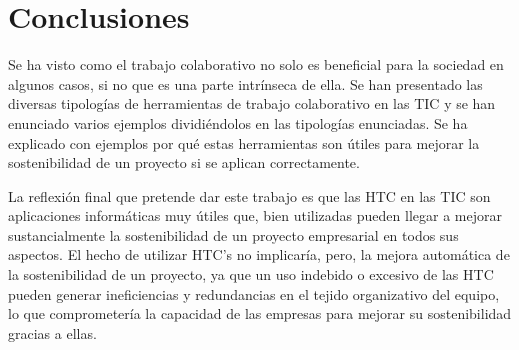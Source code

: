\section{Conclusiones}

Se ha visto como el trabajo colaborativo no solo es beneficial para la sociedad en algunos casos, si no que es una parte intrínseca de ella. Se han presentado las diversas tipologías de herramientas de trabajo colaborativo en las TIC y se han enunciado varios ejemplos dividiéndolos en las tipologías enunciadas. Se ha explicado con ejemplos por qué estas herramientas son útiles para mejorar la sostenibilidad de un proyecto si se aplican correctamente.

La reflexión final que pretende dar este trabajo es que las HTC en las TIC son aplicaciones informáticas muy útiles que, bien utilizadas pueden llegar a mejorar sustancialmente la sostenibilidad de un proyecto empresarial en todos sus aspectos. El hecho de utilizar HTC’s no implicaría, pero, la mejora automática de la sostenibilidad de un proyecto, ya que un uso indebido o excesivo de las HTC pueden generar ineficiencias y redundancias en el tejido organizativo del equipo, lo que comprometería la capacidad de las empresas para mejorar su sostenibilidad gracias a ellas.